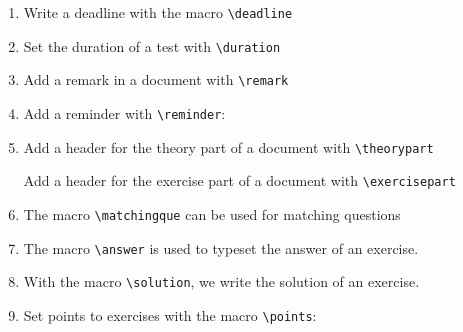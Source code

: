 \documentclass[12pt,a4page]{article}
\def\cellwidth{0.4\textwidth}
\newcommand{\miniexample}[3][t]{%
  \parbox[#1][#3][t]{\cellwidth}{#2}
}
\newcommand{\codeexample}[3][c]{%
  \colorbox[HTML]{b0c4be}{\miniexample[#1]{}{#3}}
}
\newcommand{\textexample}[3][c]{%
  {\footnotesize
    \colorbox[gray]{0.9}{\miniexample[#1]{}{#3}}%
  }
}
\newcommand{\examplerow}[3][10pt]{%
  \par\noindent\strut\hfill\codeexample{#2}{#3}\hspace{#1}\textexample{#2}{#3}\hfill\strut
}
\newlength{\exheight}
\begin{document}
\begin{enumerate}
  We can pass a date using the macros \verb|\setdate| and \verb|\getdate|.
  \examplerow{exampleMacroNameDate03.tex}{\exheight}
\item Write a deadline with the macro \verb|\deadline|
  \setlength{\exheight}{12pt}
  \examplerow{exampleMacroDeadline.tex}{\exheight}
\item Set the duration of a test with \verb|\duration|
  \setlength{\exheight}{36pt}
  \examplerow{exampleMacroDuration.tex}{\exheight}
\item Add a remark in a document with \verb|\remark|
  \setlength{\exheight}{36pt}
  \examplerow{exampleMacroRemark.tex}{\exheight}
\item Add a reminder with \verb|\reminder|:
  \setlength{\exheight}{24pt}
  \examplerow{exampleMacroReminder.tex}{\exheight}
\item Add a header for the theory part of a document with \verb|\theorypart|
  \setlength{\exheight}{32pt}
  \examplerow{exampleMacroTheorypart.tex}{\exheight}

  Add a header for the exercise part of a document with \verb|\exercisepart|
  \examplerow{exampleMacroExercisepart.tex}{\exheight}
\item The macro \verb|\matchingque| can be used for matching questions
  \setlength{\exheight}{117pt}
  \setlength{\leftmatchwidth}{10em}
  \setlength{\rightmatchwidth}{10em}
  \examplerow{exampleMacroMatchingque.tex}{\exheight}
\item The macro \verb/\answer/ is used to typeset the answer of an exercise.
  \setlength{\exheight}{49pt}
  \examplerow{exampleMacroAnswer.tex}{\exheight}
\item With the macro \verb|\solution|, we write the solution of an exercise.
  \setlength{\exheight}{98pt}
  \examplerow{exampleMacroSolution.tex}{\exheight}
\item Set points to exercises with the macro \verb|\points|:
  \setlength{\exheight}{169pt}
  \examplerow{exampleMacroPoints.tex}{\exheight}


\end{enumerate}
\end{document}
